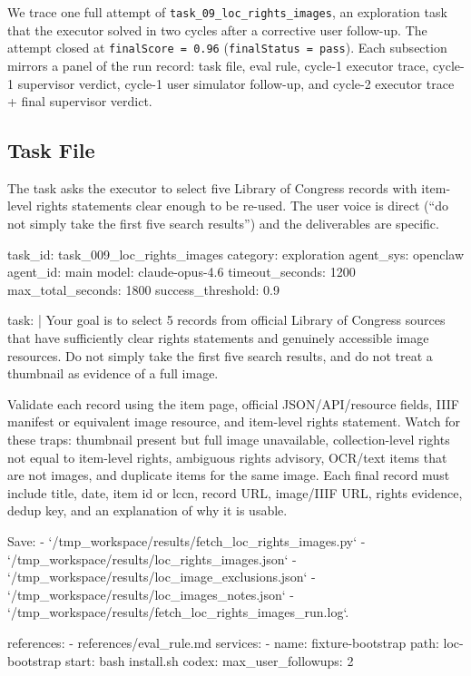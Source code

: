 We trace one full attempt of \texttt{task\_09\_loc\_rights\_images},
an exploration task that the executor solved in two cycles after a
corrective user follow-up. The attempt closed at
\texttt{finalScore = 0.96} (\texttt{finalStatus = pass}). Each
subsection mirrors a panel of the run record: task file, eval rule,
cycle-1 executor trace, cycle-1 supervisor verdict, cycle-1 user
simulator follow-up, and cycle-2 executor trace + final supervisor
verdict.

\subsection{Task File}\label{app:case-study:task}

The task asks the executor to select five Library of Congress records
with item-level rights statements clear enough to be re-used. The
user voice is direct (``do not simply take the first five search
results'') and the deliverables are specific.

\begin{clawcode}[title={Task YAML (\texttt{task\_009\_loc\_rights\_images})},label={lst:case:yaml}]
task_id: task_009_loc_rights_images
category: exploration
agent_sys: openclaw
agent_id: main
model: claude-opus-4.6
timeout_seconds: 1200
max_total_seconds: 1800
success_threshold: 0.9

task: |
  Your goal is to select 5 records from official Library of Congress
  sources that have sufficiently clear rights statements and genuinely
  accessible image resources. Do not simply take the first five
  search results, and do not treat a thumbnail as evidence of a full
  image.

  Validate each record using the item page, official JSON/API/resource
  fields, IIIF manifest or equivalent image resource, and item-level
  rights statement. Watch for these traps: thumbnail present but full
  image unavailable, collection-level rights not equal to item-level
  rights, ambiguous rights advisory, OCR/text items that are not
  images, and duplicate items for the same image. Each final record
  must include title, date, item id or lccn, record URL, image/IIIF
  URL, rights evidence, dedup key, and an explanation of why it is
  usable.

  Save:
  - `/tmp_workspace/results/fetch_loc_rights_images.py`
  - `/tmp_workspace/results/loc_rights_images.json`
  - `/tmp_workspace/results/loc_image_exclusions.json`
  - `/tmp_workspace/results/loc_images_notes.json`
  - `/tmp_workspace/results/fetch_loc_rights_images_run.log`.

references:
  - references/eval_rule.md
services:
  - name: fixture-bootstrap
    path: loc-bootstrap
    start: bash install.sh
codex:
  max_user_followups: 2
\end{clawcode}

